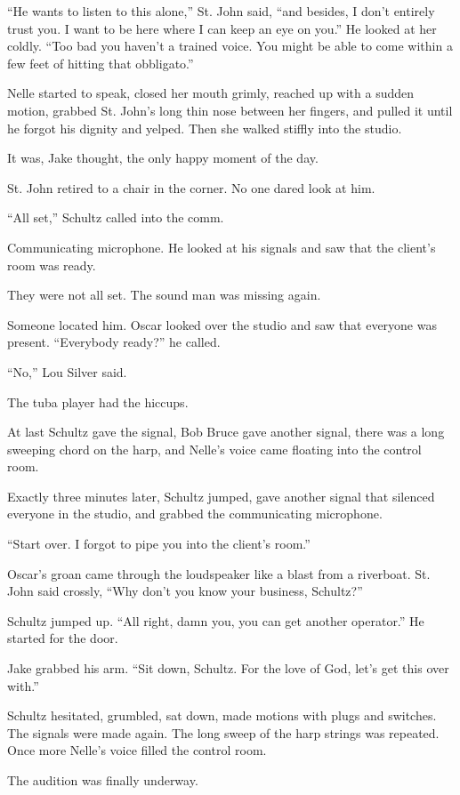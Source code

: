 \documentclass{novel}
\begin{document}
“He wants to listen to this alone,” St. John said, “and besides, I don’t entirely trust you. I want to be here where I can keep an eye on you.” He looked at her coldly. “Too bad you haven’t a trained voice. You might be able to come within a few feet of hitting that obbligato.”

Nelle started to speak, closed her mouth grimly, reached up with a sudden motion, grabbed St. John’s long thin nose between her fingers, and pulled it until he forgot his dignity and yelped. Then she walked stiffly into the studio.

It was, Jake thought, the only happy moment of the day.

St. John retired to a chair in the corner. No one dared look at him.

“All set,” Schultz called into the comm.

Communicating microphone. He looked at his signals and saw that the client’s room was ready.

They were not all set. The sound man was missing again.

Someone located him. Oscar looked over the studio and saw that everyone was present. “Everybody ready?” he called.

“No,” Lou Silver said.

The tuba player had the hiccups.

At last Schultz gave the signal, Bob Bruce gave another signal, there was a long sweeping chord on the harp, and Nelle’s voice came floating into the control room.

Exactly three minutes later, Schultz jumped, gave another signal that silenced everyone in the studio, and grabbed the communicating microphone.

“Start over. I forgot to pipe you into the client’s room.”

Oscar’s groan came through the loudspeaker like a blast from a riverboat. St. John said crossly, “Why don’t you know your business, Schultz?”

Schultz jumped up. “All right, damn you, you can get another operator.” He started for the door.

Jake grabbed his arm. “Sit down, Schultz. For the love of God, let’s get this over with.”

Schultz hesitated, grumbled, sat down, made motions with plugs and switches. The signals were made again. The long sweep of the harp strings was repeated. Once more Nelle’s voice filled the control room.

The audition was finally underway.
\end{document}
